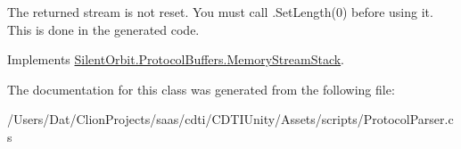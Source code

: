 The returned stream is not reset. You must call .Set\+Length(0) before using it. This is done in the generated code. 



Implements \hyperlink{interface_silent_orbit_1_1_protocol_buffers_1_1_memory_stream_stack}{Silent\+Orbit.\+Protocol\+Buffers.\+Memory\+Stream\+Stack}.



The documentation for this class was generated from the following file\+:\begin{DoxyCompactItemize}
\item 
/\+Users/\+Dat/\+Clion\+Projects/saas/cdti/\+C\+D\+T\+I\+Unity/\+Assets/scripts/Protocol\+Parser.\+cs\end{DoxyCompactItemize}
